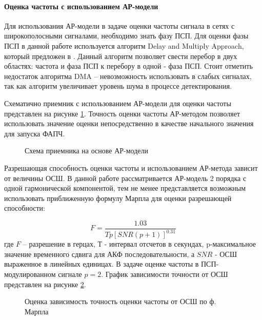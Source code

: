 \paragraph{Оценка частоты с использованием АР-модели}

Для использования АР-модели в задаче оценки частоты сигнала в сетях с широкополосными сигналами, необходимо знать фазу ПСП.
Для оценки фазы ПСП в данной работе используется алгоритм Delay and Multiply Approach, который предложен в \cite{tsui, lin_dma}.
Данный алгоритм позволяет свести перебор в двух областях: частота и фаза ПСП к перебору в одной - фаза ПСП.
Стоит отметить недостаток алгоритма DMA – невозможность использовать в слабых сигналах, так как алгоритм увеличивает уровень шума
в процессе детектирования.

Схематично приемник с использованием АР-модели для оценки частоты представлен на рисунке \ref{pic:ar_cdma_scheme}.
Точность оценки частоты АР-методом позволяет использовать значение оценки непосредственно в качестве начального значения для запуска ФАПЧ.

\begin{figure}[H]
	\center{}
	\caption{Схема приемника на основе АР-модели}
	\label{pic:ar_cdma_scheme}
\end{figure}

Разрешающая способность оценки частоты и использованием АР-метода зависит от величины ОСШ. В данной работе рассматривается
АР-модель 2 порядка с одной гармонической компонентой, тем не менее представляется возможным использовать приближенную
формулу Марпла \cite{kay_ar_book, marpl_book} для оценки разрешающей способности:

\begin{equation}
	\label{eq:ar_cdma_marple_eq}
	F = \frac{1.03}{Tp[SNR(p+1)]^{0.31}}
\end{equation}
где ${F}$ – разрешение в герцах, ${Т}$ - интервал отсчетов в секундах, p-максимальное значение временного сдвига для АКФ
последовательности, а ${SNR}$ - ОСШ выраженное в линейных единицах. В задаче оценке частоты в ПСП-модулированном сигнале ${p=2}$.
График зависимости точности от ОСШ представлен на рисунке \ref{pic:cdma_ar_marple_eq}.

\begin{figure}[H]
	\center{}
	\caption{Оценка зависимость точность оценки частоты от ОСШ по ф. Марпла}
	\label{pic:cdma_ar_marple_eq}
\end{figure}
